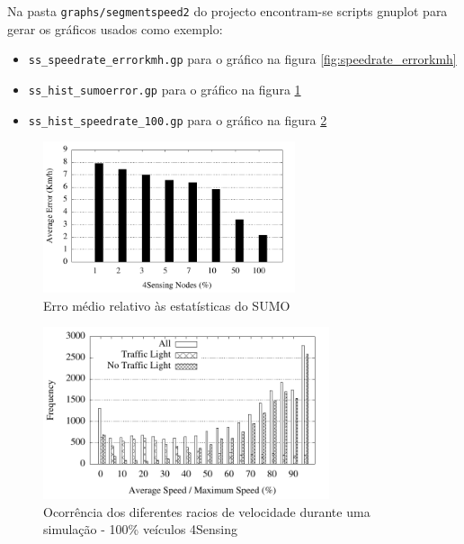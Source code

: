 \documentclass{article}
\newcommand{\fs}{4Sensing}
\newcommand{\tm}[1]{\texttt{#1}}
\begin{document}
Na pasta \tm{graphs/segmentspeed2} do projecto encontram-se scripts gnuplot para gerar os gráficos usados como exemplo:

\begin{itemize}
\item \tm{ss\_speedrate\_errorkmh.gp} para o gráfico na figura \ref{fig:speedrate_errorkmh}
\item \tm{ss\_hist\_sumoerror.gp} para o gráfico na figura \ref{fig:sumoerror}
\item \tm{ss\_hist\_speedrate\_100.gp} para o gráfico na figura \ref {fig:hist_speedrate_100}
\end{itemize}

\begin{figure}[t!]
	\centering
	\includegraphics[width=0.66\textwidth]{figs/ss_hist_sumoerror.pdf}
	\caption{Erro médio relativo às estatísticas do SUMO}
	\label{fig:sumoerror}
\end{figure}

\begin{figure}[h!]
	\vspace{-2mm}
	\centering
	\includegraphics[width=0.75\textwidth]{figs/tt_hist_speedrate_100.pdf}
	\caption{Ocorrência dos diferentes racios de velocidade durante uma simulação - 100\% veículos \fs{}}
	\label{fig:hist_speedrate_100}
\end{figure}
\end{document}
